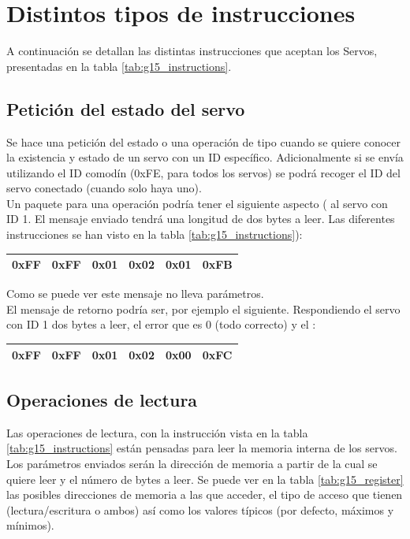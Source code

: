 	\section{Distintos tipos de instrucciones}
	A continuación se detallan las distintas instrucciones que aceptan los Servos, presentadas en la tabla \ref{tab:g15_instructions}.
	\subsection{Petición del estado del servo}
	
	Se hace una petición del estado o una operación de tipo  cuando se quiere conocer la existencia y estado de un servo con un ID específico. Adicionalmente si se envía utilizando el ID comodín (0xFE, para todos los servos) se podrá recoger el ID del servo conectado (cuando solo haya uno).
	\\ 
	
	Un paquete para una operación  podría tener el siguiente aspecto ( al servo con ID 1. El mensaje enviado tendrá una longitud de dos bytes a leer. Las diferentes instrucciones se han visto en la tabla \ref{tab:g15_instructions}):
	\begin{center}
		\begin{tabular}{|c|c|c|c|c|c|}
			\hline
			0xFF & 0xFF & 0x01 & 0x02 & 0x01 & 0xFB \\
			\hline
		\end{tabular}
	\end{center}
	
	Como se puede ver este mensaje no lleva parámetros.
	\\ 
	
	El mensaje de retorno podría ser, por ejemplo el siguiente. Respondiendo el servo con ID 1 dos bytes a leer, el error que es 0 (todo correcto) y el :
	\begin{center}
		\begin{tabular}{|c|c|c|c|c|c|}
			\hline
			0xFF & 0xFF & 0x01 & 0x02 & 0x00 & 0xFC \\
			\hline
		\end{tabular}
	\end{center}
	
	\subsection{Operaciones de lectura} 
	
	Las operaciones de lectura, con la instrucción  vista en la tabla \ref{tab:g15_instructions} están pensadas para leer la memoria interna de los servos. Los parámetros enviados serán la dirección de memoria a partir de la cual se quiere leer y el número de bytes a leer. Se puede ver en la tabla \ref{tab:g15_register} las posibles direcciones de memoria a las que acceder, el tipo de acceso que tienen (lectura/escritura o ambos) así como los valores típicos (por defecto, máximos y mínimos).
	\\ 
	
